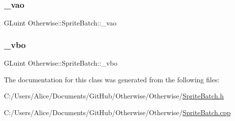 \mbox{\label{class_otherwise_1_1_sprite_batch_a7f10dd2f06d1a2dddb1d39b154b3b4e0}} 
\subsubsection{\texorpdfstring{\+\_\+vao}{\_vao}}
{\footnotesize\ttfamily G\+Luint Otherwise\+::\+Sprite\+Batch\+::\+\_\+vao\hspace{0.3cm}{\ttfamily [private]}}

\mbox{\label{class_otherwise_1_1_sprite_batch_a3dc165276ddb8236b1b25f65a031dfd1}} 
\subsubsection{\texorpdfstring{\+\_\+vbo}{\_vbo}}
{\footnotesize\ttfamily G\+Luint Otherwise\+::\+Sprite\+Batch\+::\+\_\+vbo\hspace{0.3cm}{\ttfamily [private]}}



The documentation for this class was generated from the following files\+:\begin{DoxyCompactItemize}
\item 
C\+:/\+Users/\+Alice/\+Documents/\+Git\+Hub/\+Otherwise/\+Otherwise/\hyperlink{_sprite_batch_8h}{Sprite\+Batch.\+h}\item 
C\+:/\+Users/\+Alice/\+Documents/\+Git\+Hub/\+Otherwise/\+Otherwise/\hyperlink{_sprite_batch_8cpp}{Sprite\+Batch.\+cpp}\end{DoxyCompactItemize}
